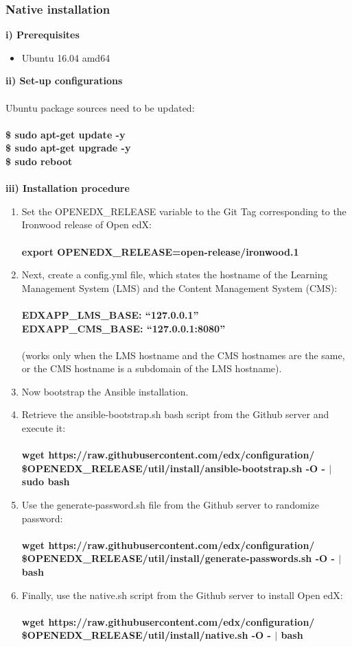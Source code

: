 \documentclass[12pt]{report}
\begin{document}
\subsubsection{Native installation}
\textbf{i) Prerequisites}
\begin{itemize}
	\item Ubuntu 16.04 amd64
\end{itemize}
\textbf{ii) Set-up configurations}\\\\
Ubuntu package sources need to be updated:\\\\
\textbf{\$ sudo apt-get update -y\\
	\$ sudo apt-get upgrade -y\\
	\$ sudo reboot\\\\
}
\textbf{iii) Installation procedure}
\begin{enumerate}
	\item Set the OPENEDX\_RELEASE variable to the Git Tag corresponding to the Ironwood release of Open edX:\\\\
	\textbf{export OPENEDX\_RELEASE=open-release/ironwood.1}
	\item Next, create a config.yml file, which states the hostname of the Learning Management System (LMS) and the Content Management System (CMS):\\\\
	\textbf{EDXAPP\_LMS\_BASE: “127.0.0.1”}\\
	\textbf{EDXAPP\_CMS\_BASE: “127.0.0.1:8080”}\\\\
	(works only when the LMS hostname and the CMS hostnames are the same, or the CMS hostname is a subdomain of the LMS hostname).
	\item Now bootstrap the Ansible installation.
	\item Retrieve the ansible-bootstrap.sh bash script from the Github server and execute it:\\\\
	\textbf{wget https://raw.githubusercontent.com/edx/configuration/\\ \$OPENEDX\_RELEASE/util/install/ansible-bootstrap.sh -O - $|$ sudo bash}
	\item Use the generate-password.sh file from the Github server to randomize password:\\\\
	\textbf{wget https://raw.githubusercontent.com/edx/configuration/\\ \$OPENEDX\_RELEASE/util/install/generate-passwords.sh -O - $|$ bash}
	\item Finally, use the native.sh script from the Github server to install Open edX:\\\\
	\textbf{wget https://raw.githubusercontent.com/edx/configuration/\\ \$OPENEDX\_RELEASE/util/install/native.sh -O - $|$ bash}
	
\end{enumerate}
\end{document}
